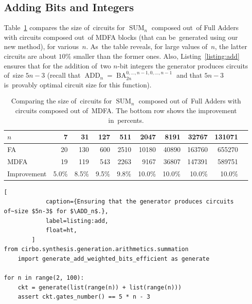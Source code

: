\documentclass[a4paper, UKenglish, cleveref, autoref,  thm-restate, anonymous]{lipics-v2021}
\DeclareMathOperator{\SUM}{SUM}
\DeclareMathOperator{\ADD}{ADD}
\DeclareMathOperator{\BA}{BA}
\begin{document}
    \subsection{Adding Bits and Integers}
    Table~\ref{table:first} compares the size of~circuits for $\SUM_n$
    composed out~of Full Adders with circuits composed out~of MDFA blocks
    (that can be~generated using our new method), for various~$n$. As~the table reveals,
    for large values of~$n$, the latter circuits are about $10\%$ smaller than the former ones. Also, Listing~\ref{listing:add} ensures that for the addition of~two $n$-bit integers the generator produces circuits of~size $5n-3$ (recall that $\ADD_n=\BA_{2n}^{0,\dotsc,n-1,0,\dotsc,n-1}$ and that $5n-3$ is~provably optimal circuit size for this function).

    \begin{table}[ht]
        \caption{Comparing the size of~circuits for $\SUM_n$ composed out of~Full Adders with
            circuits composed out of~MDFA. The bottom row shows the improvement in~percents.}
        \label{table:first}
        \begin{center}
            \begin{tabular}{lrrrrrrrrr}
                \toprule
                $n$ & 7 & 31 & 127 & 511 & 2047 & 8191 & 32767 & 131071 \\
                \midrule
                FA & 20 & 130 & 600 & 2510 & 10180 & 40890 & 163760 & 655270 \\
                MDFA & 19 & 119 & 543 & 2263 & 9167 & 36807 & 147391 & 589751 \\
                Improvement  & 5.0\%  & 8.5\%  & 9.5\%  & 9.8\%  & 10.0\%  & 10.0\%  & 10.0\%  & 10.0\% \\
                \bottomrule
            \end{tabular}
        \end{center}
    \end{table}

        \begin{lstlisting}[
            caption={Ensuring that the generator produces circuits of~size $5n-3$ for $\ADD_n$.},
            label=listing:add,
            float=ht,
        ]
from cirbo.synthesis.generation.arithmetics.summation
    import generate_add_weighted_bits_efficient as generate

for n in range(2, 100):
    ckt = generate(list(range(n)) + list(range(n)))
    assert ckt.gates_number() == 5 * n - 3
        \end{lstlisting}
\end{document}
